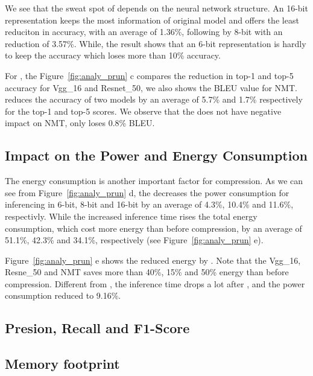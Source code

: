We see that the sweat spot of \quantization depends on the neural network structure. 
An 16-bit representation keeps the most information of original model and offers the least reduciton in accuracy,
with an average of 1.36\%, following by 8-bit with an reduction of 3.57\%.
While, the result shows that an 6-bit representation is hardly to keep the accuracy which loses more than 10\% accuracy.

For \pruning, the Figure~\ref{fig:analy_prun} c compares the reduction in top-1 and top-5 accuracy for Vgg\_16 and Resnet\_50, 
we also shows the BLEU value for NMT.
\pruning reduces the accuracy of two models by an average of 5.7\% and 1.7\% respectively for the top-1 and top-5 scores.
We observe that the \pruning does not have negative impact on NMT, only loses 0.8\% BLEU. 





\subsection{Impact on the Power and Energy Consumption}
The energy consumption is another important factor for compression.
As we can see from Figure~\ref{fig:analy_prun} d, the \quantization decreases the 
power consumption for inferencing in 6-bit, 8-bit and 16-bit by an average of 
4.3\%, 10.4\% and 11.6\%, respectivly. While the increased inference time 
rises the total energy consumption, which cost more energy than before compression, by an
average of 51.1\%, 42.3\% and 34.1\%, respectively (see Figure~\ref{fig:analy_prun} e).

Figure~\ref{fig:analy_prun} e shows the reduced energy by \pruning. Note that
the Vgg\_16, Resne\_50 and NMT saves more than 40\%, 15\% and 50\% energy than before compression.
Different from \quantization, the inference time drops a lot after \pruning, and the power consumption 
reduced to 9.16\%.

\subsection{Presion, Recall and F1-Score}



\subsection{Memory footprint}

